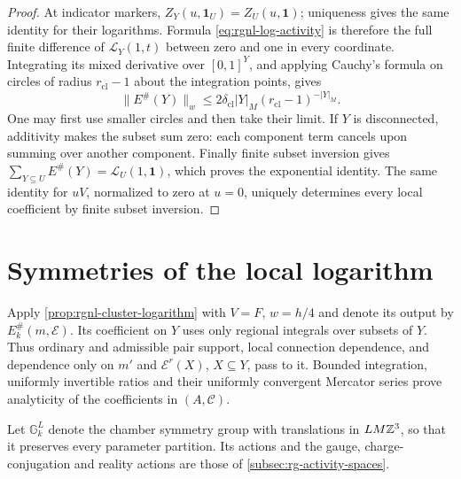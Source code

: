 \begin{proof}
At indicator markers, $Z_Y(u,\mathbf1_U)=Z_U(u,\mathbf1)$;
uniqueness gives the same identity for their logarithms.
Formula \eqref{eq:rgnl-log-activity} is therefore the full finite
difference of $\mathcal L_Y(1,t)$ between zero and one in every
coordinate. Integrating its mixed derivative over $[0,1]^Y$,
and applying Cauchy's formula on circles of radius
$r_{\mathrm{cl}}-1$ about the integration points, gives
\[
 \|E^\#(Y)\|_w\le2\delta_{\mathrm{cl}}|Y|_M
                          (r_{\mathrm{cl}}-1)^{-|Y|_M}.
\]
One may first use smaller circles and then take their limit.
If $Y$ is disconnected, additivity makes the subset sum zero:
each component term cancels upon summing over another component.
Finally finite subset inversion gives
$\sum_{Y\subseteq U}E^\#(Y)=\mathcal L_U(1,\mathbf1)$,
which proves the exponential identity. The same identity for
$uV$, normalized to zero at $u=0$, uniquely determines every
local coefficient by finite subset inversion.
\end{proof}

\section{Symmetries of the local logarithm}
\label{subsec:rgnl-symmetries}

Apply \cref{prop:rgnl-cluster-logarithm} with
$V=F$, $w=h/4$ and denote its output by
$E_k^\#(m,\mathscr E)$. Its coefficient on $Y$ uses only
regional integrals over subsets of $Y$. Thus ordinary and
admissible pair support, local connection dependence, and
dependence only on $m'$ and $\mathscr E^r(X)$, $X\subseteq Y$,
pass to it. Bounded integration, uniformly invertible ratios
and their uniformly convergent Mercator series prove analyticity
of the coefficients in $(A,\mathscr C)$.

Let $\mathbb G_k^L$ denote the chamber symmetry group with
translations in $LM\mathbb Z^3$, so that it preserves every
parameter partition. Its actions and the gauge,
charge-conjugation and reality actions are those of
\cref{subsec:rg-activity-spaces}.

